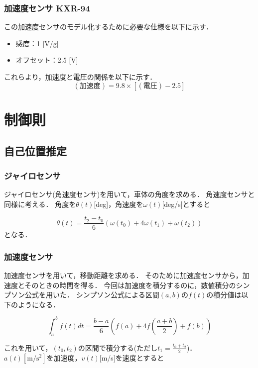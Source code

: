 \documentclass[11pt,a4]{jsarticle}
\begin{document}
\subsubsection{加速度センサ KXR-94 }
この加速度センサのモデル化するために必要な仕様を以下に示す．
\begin{itemize}
 \item 感度：1 [V/g]
 \item オフセット：2.5 [V]
\end{itemize}

これらより，加速度と電圧の関係を以下に示す．
\begin{equation}
 (加速度)=9.8×[(電圧)-2.5]
\end{equation}


\section{制御則}

\subsection{自己位置推定}
\subsubsection{ジャイロセンサ}
ジャイロセンサ(角速度センサ)を用いて，車体の角度を求める．
角速度センサと同様に考える．
角度を$\theta(t)$[deg]，角速度を$\omega(t)$[deg/s]とすると

\begin{equation}
 \theta(t)=\frac{t_2-t_0}{6}(\omega(t_0)+4\omega(t_1)+\omega(t_2) )
\end{equation}
となる．

\subsubsection{加速度センサ}
加速度センサを用いて，移動距離を求める．
そのために加速度センサから，加速度とそのときの時間を得る．
今回は加速度を積分するのに，数値積分のシンプソン公式を用いた．
シンプソン公式による区間$(a,b)$の$f(t)$の積分値は以下のようになる．


\begin{equation}
 \int_a^b f(t) dt = \frac{b-a}{6} ( f(a)+4f ( \frac{a+b}{2}) +f(b))
\end{equation}

これを用いて，$(t_0,t_2)$の区間で積分する(ただし$t_1=\frac{t_0+t_2}{2}$)．\\
$a(t)[\mathrm{m}/\mathrm{s}^{2}]$を加速度，$v(t)$[m/s]を速度とすると
\end{document}
